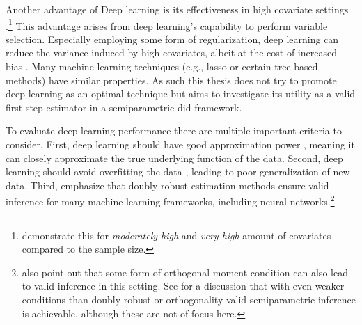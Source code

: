 Another advantage of Deep learning is its effectiveness in high covariate settings \citep{chernozhukov2022automatic}.\footnote[3]{\citet{belloni2017program} demonstrate this for \textit{moderately high} and \textit{very high} amount of covariates compared to the sample size.}
This advantage arises from deep learning's capability to perform variable selection.
Especially employing some form of regularization, deep learning can reduce the variance induced by high covariates, albeit at the cost of increased bias \citep{chernozhukovDoubleDebiasedMachine2018}.
Many machine learning techniques (e.g., lasso or certain tree-based methods) have similar properties.
As such this thesis does not try to promote deep learning as an optimal technique but aims to investigate its utility as a valid first-step estimator in a semiparametric \ac{did} framework.

To evaluate deep learning performance there are multiple important criteria to consider.
First, deep learning should have good approximation power \citep{belloni2017program}, meaning it can closely approximate the true underlying function of the data.
Second, deep learning should avoid overfitting the data \citep{belloni2017program}, leading to poor generalization of new data.
Third, \citet{belloni2017program} emphasize that doubly robust estimation methods ensure valid inference for many machine learning frameworks, including neural networks.\footnote[4]{\citet{belloni2017program} also point out that some form of orthogonal moment condition can also lead to valid inference in this setting. See \citet{DeepLearningIndividual2021} for a discussion that with even weaker conditions than doubly robust or orthogonality valid semiparametric inference is achievable, although these are not of focus here.}
